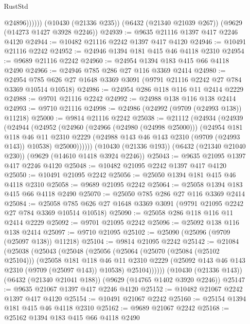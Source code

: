 \begin{lexlean}{RustStd}
\begin{coremodule}
                @24896))))))
    (@10430 (@21336 @235))
    (@6432 (@21340 @21039 @267))
    (@9629 (@14273 @1427 @3928 @2246))
@24939 := @9635 @21116 @1397 @417 @2246 @4120
@24944 := @10482 @21116 @2242 @1397 @417 @4120
@24946 := @10491 @21116 @2242
@24952 := @24946 @1394 @181 @415 @46 @4118 @2310
@24954 := @9689 @21116 @2242
@24960 := @24954 @1394 @183 @415 @66 @4118 @2490
@24966 := @24946 @785 @286 @27 @116 @3369 @2414
@24980 := @24954 @785 @626 @27 @1648 @3369 @3091 (@9791 @21116 @2242 @27 @784 @3369 @10514 @10518)
@24986 := @24954 @286 @118 @116 @11 @2414 @2229
@24988 := @9701 @21116 @2242
@24992 := @24988 @138 @116 @138 @2414
@24993 := @9710 @21116
@24998 := @24986 (@24992 (@9709 (@24993 @138)) @11218)
@25000 := @9814 @21116 @2242
@25038 := @21112
    (@24934
      (@24939
        (@24944
          (@24952
            (@24960
              (@24966 (@24980 (@24998 @25000)))
              (@24954
                @181
                @118
                @46
                @11
                @2310
                @2229
                (@24988 @143 @46 @143 @2310 (@9709 (@24993 @143)) @10538)
                @25000))))))
    (@10430 (@21336 @193))
    (@6432 (@21340 @21040 @230))
    (@9629 (@14610 @1418 @3924 @2246))
@25043 := @9635 @21095 @1397 @417 @2246 @4120
@25048 := @10482 @21095 @2242 @1397 @417 @4120
@25050 := @10491 @21095 @2242
@25056 := @25050 @1394 @181 @415 @46 @4118 @2310
@25058 := @9689 @21095 @2242
@25064 := @25058 @1394 @183 @415 @66 @4118 @2490
@25070 := @25050 @785 @286 @27 @116 @3369 @2414
@25084 := @25058 @785 @626 @27 @1648 @3369 @3091 (@9791 @21095 @2242 @27 @784 @3369 @10514 @10518)
@25090 := @25058 @286 @118 @116 @11 @2414 @2229
@25092 := @9701 @21095 @2242
@25096 := @25092 @138 @116 @138 @2414
@25097 := @9710 @21095
@25102 := @25090 (@25096 (@9709 (@25097 @138)) @11218)
@25104 := @9814 @21095 @2242
@25142 := @21084
    (@25038
      (@25043
        (@25048
          (@25056
            (@25064
              (@25070 (@25084 (@25102 @25104)))
              (@25058
                @181
                @118
                @46
                @11
                @2310
                @2229
                (@25092 @143 @46 @143 @2310 (@9709 (@25097 @143)) @10538)
                @25104))))))
    (@10430 (@21336 @143))
    (@6432 (@21340 @21041 @188))
    (@9629 (@14765 @1402 @3920 @2246))
@25147 := @9635 @21067 @1397 @417 @2246 @4120
@25152 := @10482 @21067 @2242 @1397 @417 @4120
@25154 := @10491 @21067 @2242
@25160 := @25154 @1394 @181 @415 @46 @4118 @2310
@25162 := @9689 @21067 @2242
@25168 := @25162 @1394 @183 @415 @66 @4118 @2490

\end{coremodule}
\end{lexlean}
